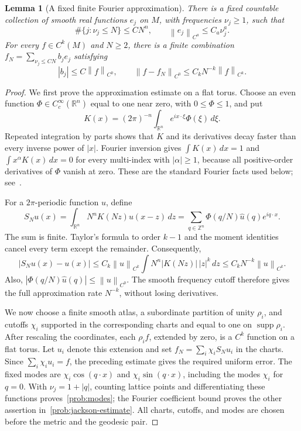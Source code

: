 \documentclass[10pt,oneside,reqno]{amsproc}
\numberwithin{equation}{section}
\newtheorem{lemma}[theorem]{Lemma}
\theoremstyle{definition}
\theoremstyle{remark}
\newcommand{\norm}[1]{\left\|#1\right\|}
\renewcommand{\ge}{\geqslant}
\renewcommand{\le}{\leqslant}
\begin{document}
\begin{lemma}[A fixed finite Fourier approximation]
\label{prob:jackson}
There is a fixed countable collection of smooth real functions $e_j$ on $M$, with frequencies $\nu_j\ge1$, such that
\begin{equation}
 \#\{j:\nu_j\le N\}\le C N^n,\qquad \norm{e_j}_{C^a}\le C_a\nu_j^a.
 \label{prob:modes}
\end{equation}
For every $f\in C^k(M)$ and $N\ge2$, there is a finite combination $f_N=\sum_{\nu_j\le CN}b_j e_j$ satisfying
\begin{equation}
 |b_j|\le C\norm{f}_{C^0},\qquad \norm{f-f_N}_{C^0}\le C_k N^{-k}\norm{f}_{C^k}.
 \label{prob:jackson-estimate}
\end{equation}
\end{lemma}

\begin{proof}
We first prove the approximation estimate on a flat torus. Choose an even function $\Phi\in C_c^\infty(\mathbb R^n)$ equal to one near zero, with $0\le\Phi\le1$, and put
\[
 K(x)=(2\pi)^{-n}\int_{\mathbb R^n}e^{i x\cdot\xi}\Phi(\xi)\,d\xi.
\]
Repeated integration by parts shows that $K$ and its derivatives decay faster than every inverse power of $|x|$. Fourier inversion gives $\int K(x)\,dx=1$ and $\int x^\alpha K(x)\,dx=0$ for every multi-index with $|\alpha|\ge1$, because all positive-order derivatives of $\Phi$ vanish at zero. These are the standard Fourier facts used below; see~\cite[Chapter~I, Section~1]{Stein}.

For a $2\pi$-periodic function $u$, define
\[
 S_Nu(x)=\int_{\mathbb R^n}N^nK(Nz)u(x-z)\,dz=\sum_{q\in\mathbb Z^n}\Phi(q/N)\widehat u(q)e^{i q\cdot x}.
\]
The sum is finite. Taylor's formula to order $k-1$ and the moment identities cancel every term except the remainder. Consequently,
\[
 |S_Nu(x)-u(x)|\le C_k\norm{u}_{C^k}\int N^n|K(Nz)|\,|z|^k\,dz\le C_kN^{-k}\norm{u}_{C^k}.
\]
Also, $|\Phi(q/N)\widehat u(q)|\le\norm{u}_{C^0}$. The smooth frequency cutoff therefore gives the full approximation rate $N^{-k}$, without losing derivatives.

We now choose a finite smooth atlas, a subordinate partition of unity $\rho_i$, and cutoffs $\chi_i$ supported in the corresponding charts and equal to one on $\operatorname{supp}\rho_i$. After rescaling the coordinates, each $\rho_i f$, extended by zero, is a $C^k$ function on a flat torus. Let $u_i$ denote this extension and set $f_N=\sum_i\chi_i S_Nu_i$ in the charts. Since $\sum_i\chi_i u_i=f$, the preceding estimate gives the required uniform error. The fixed modes are $\chi_i\cos(q\cdot x)$ and $\chi_i\sin(q\cdot x)$, including the modes $\chi_i$ for $q=0$. With $\nu_j=1+|q|$, counting lattice points and differentiating these functions proves~\eqref{prob:modes}; the Fourier coefficient bound proves the other assertion in~\eqref{prob:jackson-estimate}. All charts, cutoffs, and modes are chosen before the metric and the geodesic pair.
\end{proof}
\end{document}

